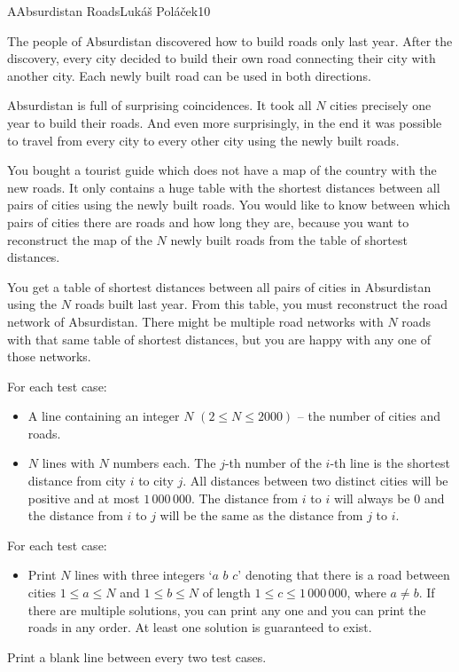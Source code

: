 \begin{icpcproblem}{A}{Absurdistan Roads}{Lukáš Poláček}{10}

The people of Absurdistan discovered how to build roads only last year. After the
discovery, every city decided to build their own road connecting their city with another city.
Each newly built road can be used in both directions.

Absurdistan is full of surprising coincidences. It took all $N$ cities precisely one year to build their
roads. And even more surprisingly, in the end it was possible to travel from every city to every
other city using the newly built roads.

You bought a tourist guide which does not have a map of the country with the new roads. It only
contains a huge table with the shortest distances between all pairs of cities using the newly built
roads. You would like to know between which pairs of cities there are roads and how long they are,
because you want to
reconstruct the map of the $N$ newly built roads from the table of shortest distances.


You get a table of shortest distances between all pairs of cities in Absurdistan using the $N$
roads built last year. From this table, you must reconstruct the road network of Absurdistan.
There might be multiple road networks with $N$ roads with that same table of shortest distances,
but you are happy with any one of those networks.


For each test case:

\begin{itemize}
\item A line containing an integer $N$ $(2\le N\le 2000)$ -- the number of cities and roads.
\item $N$ lines with $N$ numbers each. The $j$-th number of the $i$-th line is the shortest distance
  from city $i$ to city $j$. All distances between two distinct cities will be positive and at most
  $1\,000\,000$. The distance from $i$ to $i$ will always be $0$ and the distance from $i$ to $j$
  will be the same as the distance from $j$ to $i$.
\end{itemize}


For each test case:

\begin{itemize}
  \item
    Print $N$ lines with three integers `$a$ $b$ $c$' denoting that there is a
    road between cities $1 \le a \le N$ and $1 \le b \le N$ of length $1 \le c \le 1\,000\,000$, where
    $a \not = b$. If there are multiple solutions, you can print any one and you can print the roads in
    any order. At least one solution is guaranteed to exist.
\end{itemize}

Print a blank line between every two test cases.

\clearpage
{}

\end{icpcproblem}

